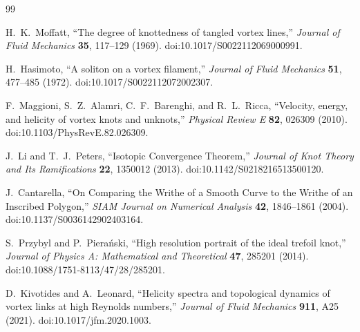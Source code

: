 \begin{thebibliography}{99}

H.~K.~Moffatt,
``The degree of knottedness of tangled vortex lines,''
\emph{Journal of Fluid Mechanics} \textbf{35}, 117--129 (1969).
doi:10.1017/S0022112069000991.

H.~Hasimoto,
``A soliton on a vortex filament,''
\emph{Journal of Fluid Mechanics} \textbf{51}, 477--485 (1972).
doi:10.1017/S0022112072002307.

F.~Maggioni, S.~Z.~Alamri, C.~F.~Barenghi, and R.~L.~Ricca,
``Velocity, energy, and helicity of vortex knots and unknots,''
\emph{Physical Review E} \textbf{82}, 026309 (2010).
doi:10.1103/PhysRevE.82.026309.

J.~Li and T.~J.~Peters,
``Isotopic Convergence Theorem,''
\emph{Journal of Knot Theory and Its Ramifications} \textbf{22}, 1350012 (2013).
doi:10.1142/S0218216513500120.

J.~Cantarella,
``On Comparing the Writhe of a Smooth Curve to the Writhe of an Inscribed Polygon,''
\emph{SIAM Journal on Numerical Analysis} \textbf{42}, 1846--1861 (2004).
doi:10.1137/S0036142902403164.

S.~Przybyl and P.~Piera\'nski,
``High resolution portrait of the ideal trefoil knot,''
\emph{Journal of Physics A: Mathematical and Theoretical} \textbf{47}, 285201 (2014).
doi:10.1088/1751-8113/47/28/285201.

D.~Kivotides and A.~Leonard,
``Helicity spectra and topological dynamics of vortex links at high Reynolds numbers,''
\emph{Journal of Fluid Mechanics} \textbf{911}, A25 (2021).
doi:10.1017/jfm.2020.1003.

\end{thebibliography}
